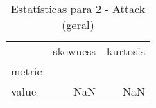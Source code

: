 \begin{table}[htbp]
\caption{Estatísticas para 2 - Attack (geral)}
\label{tab:2_-_attack_(geral)_skewkurt}
\begin{tabular}{lrr}
\toprule
 & skewness & kurtosis \\
metric &  &  \\
\midrule
value & NaN & NaN \\
\bottomrule
\end{tabular}
\end{table}
